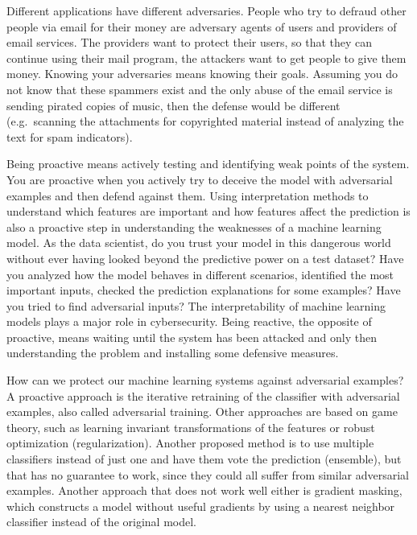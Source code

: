 \documentclass[
  11pt,
]{scrbook}
\begin{document}
Different applications have different adversaries.
People who try to defraud other people via email for their money are adversary agents of users and providers of email services.
The providers want to protect their users, so that they can continue using their mail program, the attackers want to get people to give them money.
Knowing your adversaries means knowing their goals.
Assuming you do not know that these spammers exist and the only abuse of the email service is sending pirated copies of music, then the defense would be different (e.g.~scanning the attachments for copyrighted material instead of analyzing the text for spam indicators).

Being proactive means actively testing and identifying weak points of the system.
You are proactive when you actively try to deceive the model with adversarial examples and then defend against them.
Using interpretation methods to understand which features are important and how features affect the prediction is also a proactive step in understanding the weaknesses of a machine learning model.
As the data scientist, do you trust your model in this dangerous world without ever having looked beyond the predictive power on a test dataset?
Have you analyzed how the model behaves in different scenarios, identified the most important inputs, checked the prediction explanations for some examples?
Have you tried to find adversarial inputs?
The interpretability of machine learning models plays a major role in cybersecurity.
Being reactive, the opposite of proactive, means waiting until the system has been attacked and only then understanding the problem and installing some defensive measures.

How can we protect our machine learning systems against adversarial examples?
A proactive approach is the iterative retraining of the classifier with adversarial examples, also called adversarial training.
Other approaches are based on game theory, such as learning invariant transformations of the features or robust optimization (regularization).
Another proposed method is to use multiple classifiers instead of just one and have them vote the prediction (ensemble), but that has no guarantee to work, since they could all suffer from similar adversarial examples.
Another approach that does not work well either is gradient masking, which constructs a model without useful gradients by using a nearest neighbor classifier instead of the original model.
\end{document}
